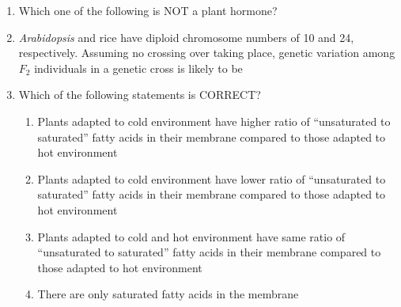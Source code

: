\documentclass[journal,12pt,onecolumn]{IEEEtran}
\theoremstyle{remark}
\begin{document}
\begin{enumerate}
\begin{enumerate}
\end{enumerate}

\item Which one of the following is NOT a plant hormone? 
\hfill{}

\begin{enumerate}
\end{enumerate}

\item \textit{Arabidopsis} and rice have diploid chromosome numbers of 10 and 24, respectively. Assuming no crossing over taking place, genetic variation among $F_2$ individuals in a genetic cross is likely to be 
\hfill{}

\begin{enumerate}
\end{enumerate}

\item Which of the following statements is CORRECT? 
\hfill{}

\begin{enumerate}
\item Plants adapted to cold environment have higher ratio of ``unsaturated to saturated'' fatty acids in their membrane compared to those adapted to hot environment
\item Plants adapted to cold environment have lower ratio of ``unsaturated to saturated'' fatty acids in their membrane compared to those adapted to hot environment
\item Plants adapted to cold and hot environment have same ratio of ``unsaturated to saturated'' fatty acids in their membrane compared to those adapted to hot environment
\item There are only saturated fatty acids in the membrane
\end{enumerate}


\end{enumerate}
\end{document}
